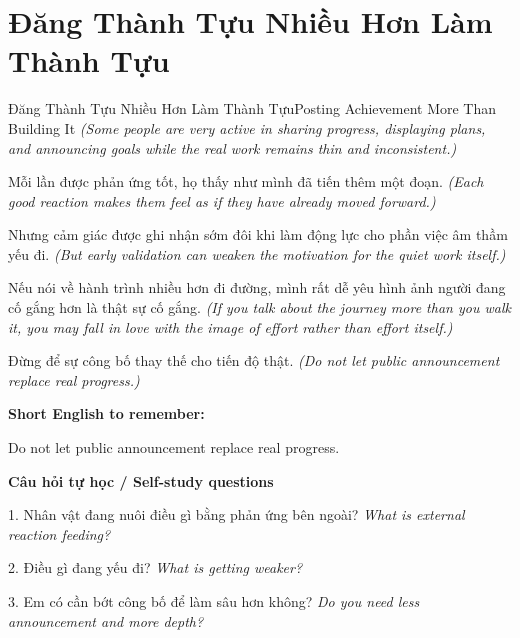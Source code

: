 \section{Đăng Thành Tựu Nhiều Hơn Làm Thành Tựu}
\begin{truyen}{Đăng Thành Tựu Nhiều Hơn Làm Thành Tựu}{Posting Achievement More Than Building It}
\textit{(Some people are very active in sharing progress, displaying plans, and announcing goals while the real work remains thin and inconsistent.)}

Mỗi lần được phản ứng tốt, họ thấy như mình đã tiến thêm một đoạn.
\textit{(Each good reaction makes them feel as if they have already moved forward.)}

Nhưng cảm giác được ghi nhận sớm đôi khi làm động lực cho phần việc âm thầm yếu đi.
\textit{(But early validation can weaken the motivation for the quiet work itself.)}

Nếu nói về hành trình nhiều hơn đi đường, mình rất dễ yêu hình ảnh người đang cố gắng hơn là thật sự cố gắng.
\textit{(If you talk about the journey more than you walk it, you may fall in love with the image of effort rather than effort itself.)}

\end{truyen}

\begin{baihoc}
Đừng để sự công bố thay thế cho tiến độ thật.
\textit{(Do not let public announcement replace real progress.)}
\end{baihoc}

\begin{ghinhoanh}
\textbf{Short English to remember:}

Do not let public announcement replace real progress.

\end{ghinhoanh}

\begin{tuhocnhanh}
\textbf{Câu hỏi tự học / Self-study questions}

1. Nhân vật đang nuôi điều gì bằng phản ứng bên ngoài? \textit{What is external reaction feeding?}

2. Điều gì đang yếu đi? \textit{What is getting weaker?}

3. Em có cần bớt công bố để làm sâu hơn không? \textit{Do you need less announcement and more depth?}
\end{tuhocnhanh}
\ngancach

